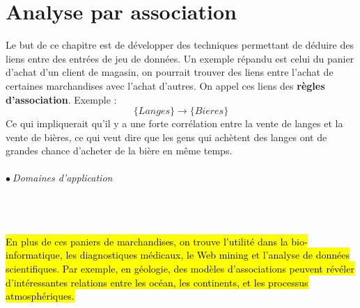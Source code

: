 \documentclass[letterpaper, 12pt]{article}
\newcommand{\alinea}{
\hspace*{0.5cm}}
\newcommand{\point}{$\bullet\ $}
\begin{document}
\part{Analyse par association}
	\alinea Le but de ce chapitre est de développer des techniques
		permettant de déduire des liens entre des entrées de jeu 
		de données. Un exemple répandu est celui du panier d'achat 
		d'un client de magasin, on pourrait trouver des liens entre
		l'achat de certaines marchandises avec l'achat d'autres. On 
		appel ces liens des \textbf{règles d'association}. Exemple :
		$$\{Langes\} \longrightarrow \{Bieres\}$$
		Ce qui impliquerait qu'il y a une forte corrélation entre
		la vente de langes et la vente de bières, ce qui veut dire
		que les gens qui achètent des langes ont de grandes chance d'acheter
		de la bière en même temps.
	\paragraph{\point Domaines d'application}~\\~\\
		\alinea \hl{En plus de ces paniers de marchandises, on trouve l'utilité
			dans la bio-informatique, les diagnostiques médicaux, 
			le Web mining et l'analyse de données scientifiques. Par exemple,
			en géologie, des modèles d'associations peuvent révéler 
			d'intéressantes relations entre les océan, les continents, et 
			les processus atmosphériques.}
\end{document}
